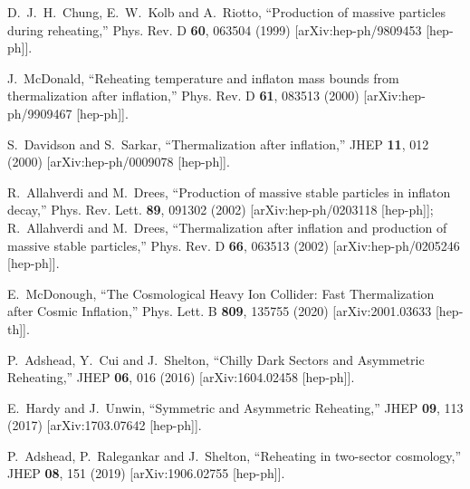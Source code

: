 \documentclass[%
aps,prd,nofootinbib,showkeys,a4paper,10pt
]{revtex4-2}
\begin{document}
\begin{thebibliography}{10}
D.~J.~H.~Chung, E.~W.~Kolb and A.~Riotto,
``Production of massive particles during reheating,''
Phys. Rev. D \textbf{60}, 063504 (1999)
[arXiv:hep-ph/9809453 [hep-ph]].   
  

J.~McDonald,
``Reheating temperature and inflaton mass bounds from thermalization after inflation,''
Phys. Rev. D \textbf{61}, 083513 (2000)
[arXiv:hep-ph/9909467 [hep-ph]].  
  

S.~Davidson and S.~Sarkar,
``Thermalization after inflation,''
JHEP \textbf{11}, 012 (2000)
[arXiv:hep-ph/0009078 [hep-ph]].


R.~Allahverdi and M.~Drees,
``Production of massive stable particles in inflaton decay,''
Phys. Rev. Lett. \textbf{89}, 091302 (2002)
[arXiv:hep-ph/0203118 [hep-ph]];
R.~Allahverdi and M.~Drees,
``Thermalization after inflation and production of massive stable particles,''
Phys. Rev. D \textbf{66}, 063513 (2002)
[arXiv:hep-ph/0205246 [hep-ph]].


E.~McDonough,
``The Cosmological Heavy Ion Collider: Fast Thermalization after Cosmic Inflation,''
Phys. Lett. B \textbf{809}, 135755 (2020)
[arXiv:2001.03633 [hep-th]].



P.~Adshead, Y.~Cui and J.~Shelton,
``Chilly Dark Sectors and Asymmetric Reheating,''
JHEP \textbf{06}, 016 (2016)
[arXiv:1604.02458 [hep-ph]].


E.~Hardy and J.~Unwin,
``Symmetric and Asymmetric Reheating,''
JHEP \textbf{09}, 113 (2017)
[arXiv:1703.07642 [hep-ph]].


P.~Adshead, P.~Ralegankar and J.~Shelton,
``Reheating in two-sector cosmology,''
JHEP \textbf{08}, 151 (2019)
[arXiv:1906.02755 [hep-ph]].



\end{thebibliography}
\end{document}
